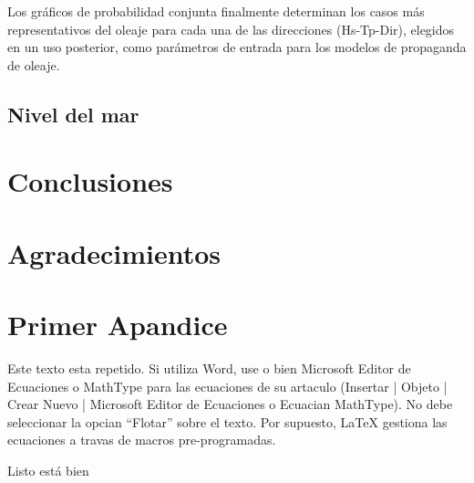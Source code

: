 \documentclass[5p,times,authoryear]{elsarticle}
\begin{document}
Los gráficos de probabilidad conjunta finalmente determinan los casos más representativos del oleaje para cada una de las direcciones (Hs-Tp-Dir), elegidos en un uso posterior, como parámetros de entrada para los modelos de propaganda de oleaje.


\subsection{Nivel del mar}

\section{Conclusiones}



\section*{Agradecimientos}


\label{}









\appendix
\section{Primer Apandice}    %
Este texto esta repetido. Si utiliza Word, use o bien Microsoft Editor de Ecuaciones o
MathType  para las ecuaciones de su artaculo (Insertar | Objeto |
Crear Nuevo | Microsoft Editor de Ecuaciones o Ecuacian MathType).
No debe seleccionar la opcian ``Flotar'' sobre el texto. Por
supuesto, LaTeX gestiona las ecuaciones a travas de macros
pre-programadas.

Listo está bien
\end{document}

